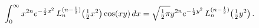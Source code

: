 \[\int_{0}^{\infty}x^{2n}e^{-\frac{1}{2}x^{2}}\mathop{L^{(n-\frac{1}{2})}_{n}\/}%
\nolimits\!\left(\tfrac{1}{2}x^{2}\right)\mathop{\cos\/}\nolimits\!\left(xy%
\right)dx=\sqrt{\tfrac{1}{2}\pi}y^{2n}e^{-\frac{1}{2}y^{2}}\mathop{L^{(n-\frac%
{1}{2})}_{n}\/}\nolimits\!\left(\tfrac{1}{2}y^{2}\right).\]